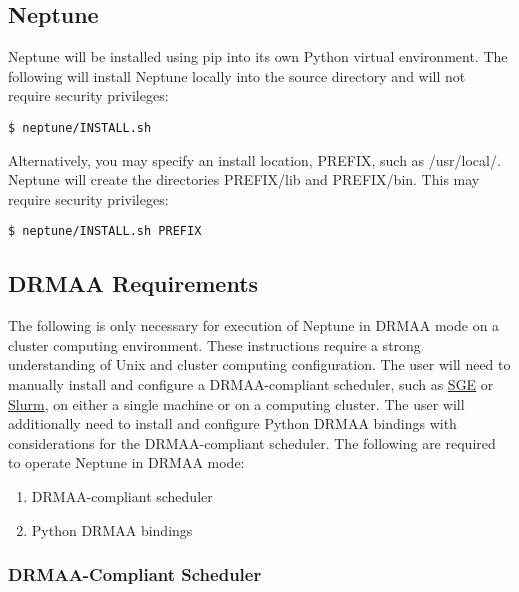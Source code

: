\documentclass[a4paper,10pt]{article}
\begin{document}
\subsection{Neptune}

Neptune will be installed using pip into its own Python virtual environment. The following will install Neptune locally into the source directory and will not require security privileges:

\begin{minipage}{\linewidth}
\begin{lstlisting}[frame=single, style=bash]
$ neptune/INSTALL.sh
\end{lstlisting}
\end{minipage}

Alternatively, you may specify an install location, PREFIX, such as /usr/local/. Neptune will create the directories PREFIX/lib and PREFIX/bin. This may require security privileges:

\begin{minipage}{\linewidth}
\begin{lstlisting}[frame=single, style=bash]
$ neptune/INSTALL.sh PREFIX
\end{lstlisting}
\end{minipage}

\newpage
\subsection{DRMAA Requirements}

The following is only necessary for execution of Neptune in DRMAA mode on a cluster computing environment. These instructions require a strong understanding of Unix and cluster computing configuration. The user will need to manually install and configure a DRMAA-compliant scheduler, such as \href{http://gridscheduler.sourceforge.net/}{SGE} or \href{http://slurm.schedmd.com/}{Slurm}, on either a single machine or on a computing cluster. The user will additionally need to install and configure Python DRMAA bindings with considerations for the DRMAA-compliant scheduler. The following are required to operate Neptune in DRMAA mode:

\begin{enumerate}
  \item DRMAA-compliant scheduler
  \item Python DRMAA bindings
\end{enumerate}

\subsubsection{DRMAA-Compliant Scheduler}
\end{document}

